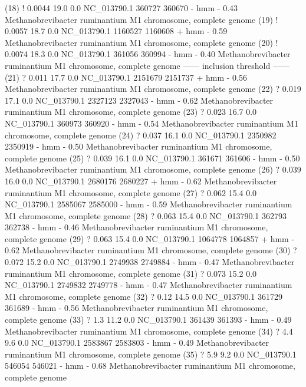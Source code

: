 \begin{sreoutput}
 (18) !    0.0044   19.0   0.0  NC_013790.1  360727  360670 - hmm     - 0.43  Methanobrevibacter ruminantium M1 chromosome, complete genome
 (19) !    0.0057   18.7   0.0  NC_013790.1 1160527 1160608 + hmm     - 0.59  Methanobrevibacter ruminantium M1 chromosome, complete genome
 (20) !    0.0074   18.3   0.0  NC_013790.1  361056  360994 - hmm     - 0.40  Methanobrevibacter ruminantium M1 chromosome, complete genome
 ------ inclusion threshold ------
 (21) ?     0.011   17.7   0.0  NC_013790.1 2151679 2151737 + hmm     - 0.56  Methanobrevibacter ruminantium M1 chromosome, complete genome
 (22) ?     0.019   17.1   0.0  NC_013790.1 2327123 2327043 - hmm     - 0.62  Methanobrevibacter ruminantium M1 chromosome, complete genome
 (23) ?     0.023   16.7   0.0  NC_013790.1  360973  360920 - hmm     - 0.54  Methanobrevibacter ruminantium M1 chromosome, complete genome
 (24) ?     0.037   16.1   0.0  NC_013790.1 2350982 2350919 - hmm     - 0.50  Methanobrevibacter ruminantium M1 chromosome, complete genome
 (25) ?     0.039   16.1   0.0  NC_013790.1  361671  361606 - hmm     - 0.50  Methanobrevibacter ruminantium M1 chromosome, complete genome
 (26) ?     0.039   16.0   0.0  NC_013790.1 2680176 2680227 + hmm     - 0.62  Methanobrevibacter ruminantium M1 chromosome, complete genome
 (27) ?     0.062   15.4   0.0  NC_013790.1 2585067 2585000 - hmm     - 0.59  Methanobrevibacter ruminantium M1 chromosome, complete genome
 (28) ?     0.063   15.4   0.0  NC_013790.1  362793  362738 - hmm     - 0.46  Methanobrevibacter ruminantium M1 chromosome, complete genome
 (29) ?     0.063   15.4   0.0  NC_013790.1 1064778 1064857 + hmm     - 0.62  Methanobrevibacter ruminantium M1 chromosome, complete genome
 (30) ?     0.072   15.2   0.0  NC_013790.1 2749938 2749884 - hmm     - 0.47  Methanobrevibacter ruminantium M1 chromosome, complete genome
 (31) ?     0.073   15.2   0.0  NC_013790.1 2749832 2749778 - hmm     - 0.47  Methanobrevibacter ruminantium M1 chromosome, complete genome
 (32) ?      0.12   14.5   0.0  NC_013790.1  361729  361689 - hmm     - 0.56  Methanobrevibacter ruminantium M1 chromosome, complete genome
 (33) ?       1.3   11.2   0.0  NC_013790.1  361439  361393 - hmm     - 0.49  Methanobrevibacter ruminantium M1 chromosome, complete genome
 (34) ?       4.4    9.6   0.0  NC_013790.1 2583867 2583803 - hmm     - 0.49  Methanobrevibacter ruminantium M1 chromosome, complete genome
 (35) ?       5.9    9.2   0.0  NC_013790.1  546054  546021 - hmm     - 0.68  Methanobrevibacter ruminantium M1 chromosome, complete genome
\end{sreoutput}

